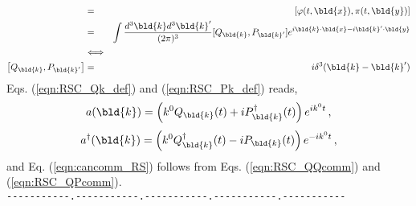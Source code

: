 {\begin{eqnarray}
&=&
[\varphi(t, \bld{x}), \pi(t, \bld{y}) ]
\nonumber\\
&=&
\int \frac{d^3 \bld{k} d^3 \bld{k}'}{(2\pi)^3} [Q_{\bld{k}}, P_{\bld{k}'}]
e^{i \bld{k} \cdot \bld{x} - i \bld{k}' \cdot \bld{y}}
\nonumber\\
&\Longleftrightarrow&    
\nonumber\\
\left[ Q_{\bld{k}}, P_{\bld{k}'} \right] &=& i \delta^3 (\bld{k} - \bld{k}')
\label{eqn:RSC_QPcomm}
\end{eqnarray}
Eqs. (\ref{eqn:RSC_Qk_def}) and (\ref{eqn:RSC_Pk_def})
reads,
\begin{equation}
a(\bld{k}) = \left( k^0 Q_{\bld{k}} (t) + i P_{\bld{k}}^\dagger (t) \right)
e^{i k^0 t}\,,
\label{eqn:RSC_a_by_QP} 
\end{equation}
\begin{equation}
a^\dagger(\bld{k}) = \left( k^0 Q_{\bld{k}}^\dagger (t) - i P_{\bld{k}} (t) \right)
e^{- i k^0 t}\,,
\label{eqn:RSC_a_by_QP} 
\end{equation}
and Eq. (\ref{eqn:cancomm_RS}) follows
from Eqs. (\ref{eqn:RSC_QQcomm}) and (\ref{eqn:RSC_QPcomm}).
}\\
\verb/-----------.-----------.-----------.-----------.-----------/\\

